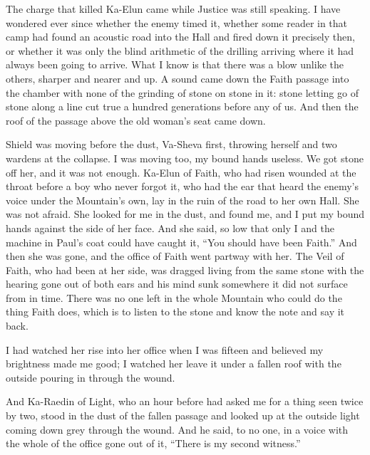 \ornament

The charge that killed Ka-Elun came while Justice was still speaking. I have wondered ever since whether the enemy timed it, whether some reader in that camp had found an acoustic road into the Hall and fired down it precisely then, or whether it was only the blind arithmetic of the drilling arriving where it had always been going to arrive. What I know is that there was a blow unlike the others, sharper and nearer and up. A sound came down the Faith passage into the chamber with none of the grinding of stone on stone in it: stone letting go of stone along a line cut true a hundred generations before any of us. And then the roof of the passage above the old woman's seat came down.\par

Shield was moving before the dust, Va-Sheva first, throwing herself and two wardens at the collapse. I was moving too, my bound hands useless. We got stone off her, and it was not enough. Ka-Elun of Faith, who had risen wounded at the throat before a boy who never forgot it, who had the ear that heard the enemy's voice under the Mountain's own, lay in the ruin of the road to her own Hall. She was not afraid. She looked for me in the dust, and found me, and I put my bound hands against the side of her face. And she said, so low that only I and the machine in Paul's coat could have caught it, ``You should have been Faith.'' And then she was gone, and the office of Faith went partway with her. The Veil of Faith, who had been at her side, was dragged living from the same stone with the hearing gone out of both ears and his mind sunk somewhere it did not surface from in time. There was no one left in the whole Mountain who could do the thing Faith does, which is to listen to the stone and know the note and say it back.\par

I had watched her rise into her office when I was fifteen and believed my brightness made me good; I watched her leave it under a fallen roof with the outside pouring in through the wound.\par

And Ka-Raedin of Light, who an hour before had asked me for a thing seen twice by two, stood in the dust of the fallen passage and looked up at the outside light coming down grey through the wound. And he said, to no one, in a voice with the whole of the office gone out of it, ``There is my second witness.''\par

